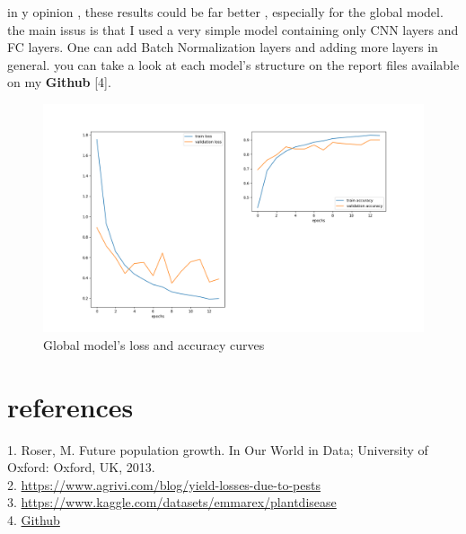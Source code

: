 \documentclass{article}
\begin{document}
\begin{multicols}{2}
in y opinion , these results could be far better , especially for the global model. the main issus is that I used a very simple model containing only CNN layers and FC layers. One can add Batch Normalization layers and adding more layers in general. you can take a look at each model's structure on the report files available on my \textbf{Github} [4].
\end{multicols}

\begin{figure}[H]
\centerline{\includegraphics[scale=0.4]{img/global_results}}
\caption{Global model's loss and accuracy curves}
\end{figure}

\section{references}
1.  Roser, M. Future population growth. In Our World in Data; University of Oxford: Oxford, UK, 2013.\\
2. \href{https://www.agrivi.com/blog/yield-losses-due-to-pests}{https://www.agrivi.com/blog/yield-losses-due-to-pests} \\
3. \href{https://www.kaggle.com/datasets/emmarex/plantdisease}{https://www.kaggle.com/datasets/emmarex/plantdisease}\\
4.  \href{https://github.com/belbossGio/Crop-deseases-and-pests-detection}{Github}
\end{document}
